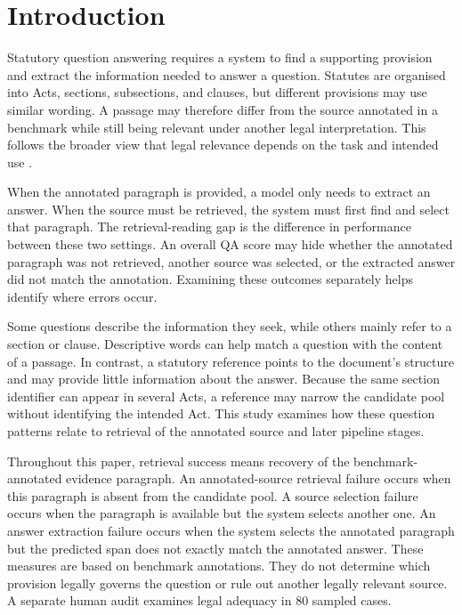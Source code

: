 \documentclass[pdflatex,sn-basic]{sn-jnl}%
\theoremstyle{thmstyleone}%
\theoremstyle{thmstyletwo}%
\theoremstyle{thmstylethree}%
\begin{document}
\section{Introduction}\label{sec:intro}

Statutory question answering requires a system to find a supporting provision
and extract the information needed to answer a question. Statutes are organised
into Acts, sections, subsections, and clauses, but different provisions may use
similar wording. A passage may therefore differ from the source annotated in a
benchmark while still being relevant under another legal interpretation. This
follows the broader view that legal relevance depends on the task and intended
use \citep{van2017concept,vsavelka2022legal}.

When the annotated paragraph is provided, a model only needs to extract an
answer. When the source must be retrieved, the system must first find and select
that paragraph. The retrieval-reading gap is the difference in
performance between these two settings. An overall QA score may hide whether
the annotated paragraph was not retrieved, another source was selected, or the
extracted answer did not match the annotation. Examining these outcomes
separately helps identify where errors occur.

Some questions describe the information they seek, while others mainly refer
to a section or clause. Descriptive words can help match a question with the
content of a passage. In contrast, a statutory reference points to the
document's structure and may provide little information about the answer.
Because the same section identifier can appear in several Acts, a reference may
narrow the candidate pool without identifying the intended Act. This study
examines how these question patterns relate to retrieval of the annotated
source and later pipeline stages.

Throughout this paper, retrieval success means recovery of the
benchmark-annotated evidence paragraph. An annotated-source retrieval
failure occurs when this paragraph is absent from the candidate pool. A
source selection failure occurs when the paragraph is available but the
system selects another one. An answer extraction failure occurs when the
system selects the annotated paragraph but the predicted span does not exactly
match the annotated answer. These measures are based on benchmark annotations.
They do not determine which provision legally governs the question or rule out
another legally relevant source. A separate human audit examines legal adequacy
in 80 sampled cases.
\end{document}
